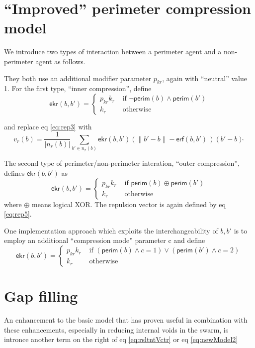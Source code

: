 \documentclass[12pt,a4paper]{article}
\begin{document}
\section{``Improved'' perimeter compression model}
We introduce two types of interaction between a perimeter agent and a non-perimeter agent as follows.

They both use an additional modifier parameter $p_{kr}$, again with ``neutral'' value 1. For the first type, ``inner compression'', define
\begin{equation}\label{eq:ekr}
\mathsf{ekr}(b, b') = \begin{cases}
   p_{kr} k_r & \text{ if } \neg \mathsf{perim}(b) \wedge \mathsf{perim}(b')\\
   k_r  & \text{ otherwise }
   \end{cases}
\end{equation}

and replace eq \ref{eq:rep3} with
\begin{equation}\label{eq:rep5}
v_r(b) = \frac{1}{|n_r(b)|}\sum_{b' \in n_r(b)} \mathsf{ekr}(b,b') \left(\|b' - b\| - \mathsf{erf}(b,b') \, \right) (b'-b)\hat~
\end{equation}

The second type of perimeter/non-perimeter interation, ``outer compression'', defines $\mathsf{ekr}(b, b')$ as
\begin{equation}\label{eq:ekr2}
\mathsf{ekr}(b, b') = \begin{cases}
   p_{kr} k_r & \text{ if } \mathsf{perim}(b) \oplus \mathsf{perim}(b')\\
   k_r  & \text{ otherwise }
   \end{cases}
\end{equation}
where $\oplus$ means logical XOR. The repulsion vector is again defined by eq \ref{eq:rep5}. 


One implementation approach which exploits the interchangeability of $b, b'$ is to employ an additional ``compression mode'' parameter c and define 
\begin{equation}\label{eq:ekr3}
\mathsf{ekr}(b, b') = \begin{cases}
   p_{kr} k_r & \text{ if } (\mathsf{perim}(b) \wedge c=1) \vee (\mathsf{perim}(b') \wedge c=2)\\
   k_r  & \text{ otherwise }
   \end{cases}
\end{equation}


\section{Gap filling}
An enhancement to the basic model that has proven useful in combination with these enhancements, especially in reducing internal voids in the swarm, is intronce another term on the right of eq \ref{eq:rsltntVctr} or eq \ref{eq:newModel2}
\end{document}
